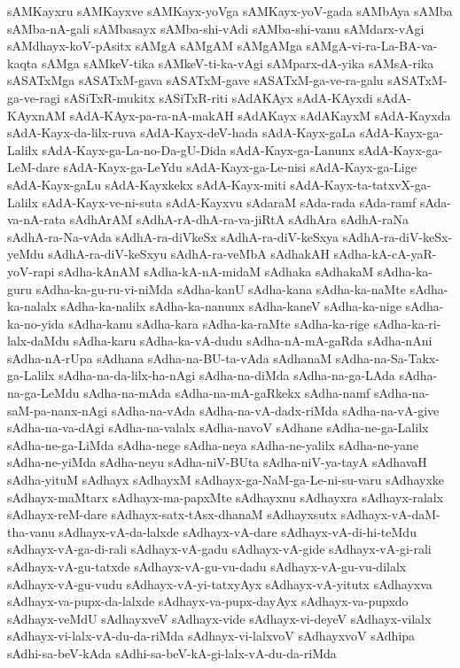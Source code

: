 {sAMKayxru
sAMKayxve
sAMKayx-yoVga
sAMKayx-yoV-gada
sAMbAya
sAMba
sAMba-nA-gali
sAMbasayx
sAMba-shi-vAdi
sAMba-shi-vanu
sAMdarx-vAgi
sAMdhayx-koV-pAsitx
sAMgA
sAMgAM
sAMgAMga
sAMgA-vi-ra-La-BA-va-kaqta
sAMga
sAMkeV-tika
sAMkeV-ti-ka-vAgi
sAMparx-dA-yika
sAMsA-rika
sASATxMga
sASATxM-gava
sASATxM-gave
sASATxM-ga-ve-ra-galu
sASATxM-ga-ve-ragi
sASiTxR-mukitx
sASiTxR-riti
sAdAKAyx
sAdA-KAyxdi
sAdA-KAyxnAM
sAdA-KAyx-pa-ra-nA-makAH
sAdAKayx
sAdAKayxM
sAdA-Kayxda
sAdA-Kayx-da-lilx-ruva
sAdA-Kayx-deV-hada
sAdA-Kayx-gaLa
sAdA-Kayx-ga-Lalilx
sAdA-Kayx-ga-La-no-Da-gU-Dida
sAdA-Kayx-ga-Lanunx
sAdA-Kayx-ga-LeM-dare
sAdA-Kayx-ga-LeYdu
sAdA-Kayx-ga-Le-nisi
sAdA-Kayx-ga-Lige
sAdA-Kayx-gaLu
sAdA-Kayxkekx
sAdA-Kayx-miti
sAdA-Kayx-ta-tatxvX-ga-Lalilx
sAdA-Kayx-ve-ni-suta
sAdA-Kayxvu
sAdaraM
sAda-rada
sAda-ramf
sAda-va-nA-rata
sAdhArAM
sAdhA-rA-dhA-ra-va-jiRtA
sAdhAra
sAdhA-raNa
sAdhA-ra-Na-vAda
sAdhA-ra-diVkeSx
sAdhA-ra-diV-keSxya
sAdhA-ra-diV-keSx-yeMdu
sAdhA-ra-diV-keSxyu
sAdhA-ra-veMbA
sAdhakAH
sAdha-kA-cA-yaR-yoV-rapi
sAdha-kAnAM
sAdha-kA-nA-midaM
sAdhaka
sAdhakaM
sAdha-ka-guru
sAdha-ka-gu-ru-vi-niMda
sAdha-kanU
sAdha-kana
sAdha-ka-naMte
sAdha-ka-nalalx
sAdha-ka-nalilx
sAdha-ka-nanunx
sAdha-kaneV
sAdha-ka-nige
sAdha-ka-no-yida
sAdha-kanu
sAdha-kara
sAdha-ka-raMte
sAdha-ka-rige
sAdha-ka-ri-lalx-daMdu
sAdha-karu
sAdha-ka-vA-dudu
sAdha-nA-mA-gaRda
sAdha-nAni
sAdha-nA-rUpa
sAdhana
sAdha-na-BU-ta-vAda
sAdhanaM
sAdha-na-Sa-Takx-ga-Lalilx
sAdha-na-da-lilx-ha-nAgi
sAdha-na-diMda
sAdha-na-ga-LAda
sAdha-na-ga-LeMdu
sAdha-na-mAda
sAdha-na-mA-gaRkekx
sAdha-namf
sAdha-na-saM-pa-nanx-nAgi
sAdha-na-vAda
sAdha-na-vA-dadx-riMda
sAdha-na-vA-give
sAdha-na-va-dAgi
sAdha-na-valalx
sAdha-navoV
sAdhane
sAdha-ne-ga-Lalilx
sAdha-ne-ga-LiMda
sAdha-nege
sAdha-neya
sAdha-ne-yalilx
sAdha-ne-yane
sAdha-ne-yiMda
sAdha-neyu
sAdha-niV-BUta
sAdha-niV-ya-tayA
sAdhavaH
sAdha-yituM
sAdhayx
sAdhayxM
sAdhayx-ga-NaM-ga-Le-ni-su-varu
sAdhayxke
sAdhayx-maMtarx
sAdhayx-ma-papxMte
sAdhayxnu
sAdhayxra
sAdhayx-ralalx
sAdhayx-reM-dare
sAdhayx-satx-tAsx-dhanaM
sAdhayxsutx
sAdhayx-vA-daM-tha-vanu
sAdhayx-vA-da-lalxde
sAdhayx-vA-dare
sAdhayx-vA-di-hi-teMdu
sAdhayx-vA-ga-di-rali
sAdhayx-vA-gadu
sAdhayx-vA-gide
sAdhayx-vA-gi-rali
sAdhayx-vA-gu-tatxde
sAdhayx-vA-gu-vu-dadu
sAdhayx-vA-gu-vu-dilalx
sAdhayx-vA-gu-vudu
sAdhayx-vA-yi-tatxyAyx
sAdhayx-vA-yitutx
sAdhayxva
sAdhayx-va-pupx-da-lalxde
sAdhayx-va-pupx-dayAyx
sAdhayx-va-pupxdo
sAdhayx-veMdU
sAdhayxveV
sAdhayx-vide
sAdhayx-vi-deyeV
sAdhayx-vilalx
sAdhayx-vi-lalx-vA-du-da-riMda
sAdhayx-vi-lalxvoV
sAdhayxvoV
sAdhipa
sAdhi-sa-beV-kAda
sAdhi-sa-beV-kA-gi-lalx-vA-du-da-riMda
}
